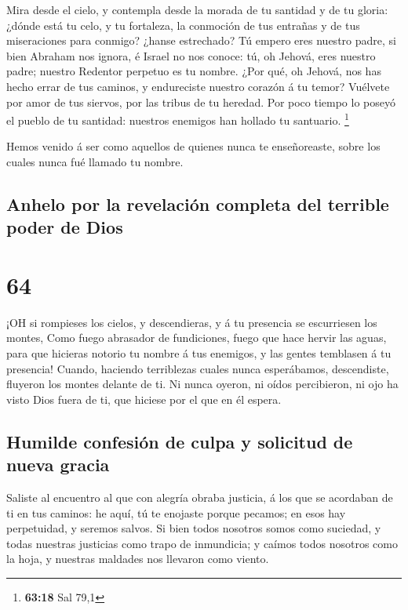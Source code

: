  Mira desde el cielo, y contempla desde la morada de tu
santidad y de tu gloria: ¿dónde está tu celo, y tu fortaleza, la
conmoción de tus entrañas y de tus miseraciones para conmigo? ¿hanse
estrechado?  Tú empero eres nuestro padre, si bien Abraham
nos ignora, é Israel no nos conoce: tú, oh Jehová, eres nuestro padre;
nuestro Redentor perpetuo es tu nombre.  ¿Por qué, oh
Jehová, nos has hecho errar de tus caminos, y endureciste nuestro
corazón á tu temor? Vuélvete por amor de tus siervos, por las tribus de
tu heredad.  Por poco tiempo lo poseyó el pueblo de tu
santidad: nuestros enemigos han hollado tu santuario. \footnote{\textbf{63:18}
  Sal 79,1}

 Hemos venido á ser como aquellos de quienes nunca te
enseñoreaste, sobre los cuales nunca fué llamado tu nombre.

\hypertarget{anhelo-por-la-revelaciuxf3n-completa-del-terrible-poder-de-dios}{%
\subsection{Anhelo por la revelación completa del terrible poder de
Dios}\label{anhelo-por-la-revelaciuxf3n-completa-del-terrible-poder-de-dios}}

\hypertarget{section-63}{%
\section{64}\label{section-63}}

 ¡OH si rompieses los cielos, y descendieras, y á tu
presencia se escurriesen los montes,  Como fuego abrasador
de fundiciones, fuego que hace hervir las aguas, para que hicieras
notorio tu nombre á tus enemigos, y las gentes temblasen á tu presencia!
 Cuando, haciendo terriblezas cuales nunca esperábamos,
descendiste, fluyeron los montes delante de ti.  Ni nunca
oyeron, ni oídos percibieron, ni ojo ha visto Dios fuera de ti, que
hiciese por el que en él espera.

\hypertarget{humilde-confesiuxf3n-de-culpa-y-solicitud-de-nueva-gracia}{%
\subsection{Humilde confesión de culpa y solicitud de nueva
gracia}\label{humilde-confesiuxf3n-de-culpa-y-solicitud-de-nueva-gracia}}

 Saliste al encuentro al que con alegría obraba justicia, á
los que se acordaban de ti en tus caminos: he aquí, tú te enojaste
porque pecamos; en esos hay perpetuidad, y seremos salvos. 
Si bien todos nosotros somos como suciedad, y todas nuestras justicias
como trapo de inmundicia; y caímos todos nosotros como la hoja, y
nuestras maldades nos llevaron como viento.

